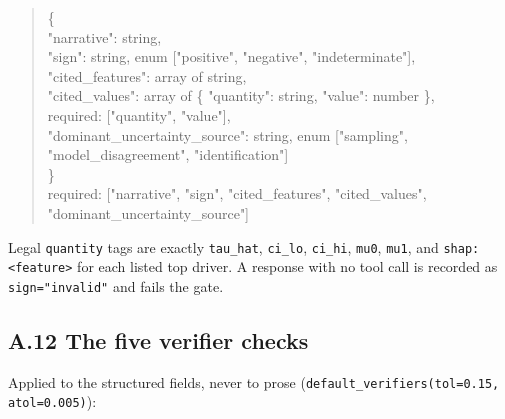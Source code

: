 \begin{quote}\small\ttfamily\raggedright
\{\\
\hspace*{1em}"narrative": string,\\
\hspace*{1em}"sign": string, enum ["positive", "negative", "indeterminate"],\\
\hspace*{1em}"cited\_features": array of string,\\
\hspace*{1em}"cited\_values": array of \{ "quantity": string, "value": number \},\\
\hspace*{2em}\quad required: ["quantity", "value"],\\
\hspace*{1em}"dominant\_uncertainty\_source": string, enum ["sampling",\\
\hspace*{2em}"model\_disagreement", "identification"]\\
\}\\
required: ["narrative", "sign", "cited\_features", "cited\_values",\\
\hspace*{2em}"dominant\_uncertainty\_source"]
\end{quote}

Legal \texttt{quantity} tags are exactly
\texttt{tau\_hat}, \texttt{ci\_lo}, \texttt{ci\_hi}, \texttt{mu0}, \texttt{mu1},
and \texttt{shap:<feature>} for each listed top driver. A response with no tool
call is recorded as \texttt{sign="invalid"} and fails the gate.

\subsection*{A.12 The five verifier checks}

Applied to the structured fields, never to prose
(\texttt{default\_verifiers(tol=0.15, atol=0.005)}):

